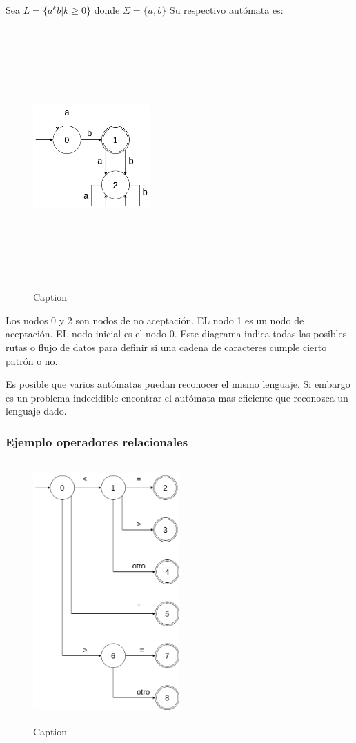 Sea $L = \{a^kb\vert k \geq 0\}$ donde $\Sigma = \{a, b\}$
Su respectivo autómata es:
\begin{figure}[H]
    \centering
    \includegraphics[width=0.4\textwidth, height=10cm,keepaspectratio]{chapters/chapter2/figures/Ejemplo 1 automatas.png}
    \caption{Caption}
    \label{fig:my_label}
\end{figure}

Los nodos 0 y 2 son nodos de no aceptación. EL nodo 1 es un nodo de aceptación. EL nodo inicial es el nodo 0. Este diagrama indica todas las posibles rutas o flujo de datos para definir si una cadena de caracteres cumple cierto patrón o no.

Es posible que varios autómatas puedan reconocer el mismo lenguaje. Si embargo es un problema indecidible encontrar el autómata mas eficiente que reconozca un lenguaje dado.

\subsubsection*{Ejemplo operadores relacionales}

\begin{figure}[H]
    \centering
    \includegraphics[width=0.5\textwidth, height=10cm,keepaspectratio]{chapters/chapter2/figures/Ejemplo 2 operadores relacionales.png}
    \caption{Caption}
    \label{fig:my_label}
\end{figure}

